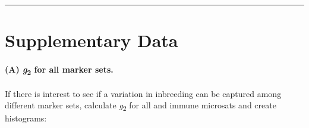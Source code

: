 \documentclass[]{article}
\let\oldparagraph\paragraph
\renewcommand{\paragraph}[1]{\oldparagraph{#1}\mbox{}}
\begin{document}
\begin{center}\rule{0.5\linewidth}{\linethickness}\end{center}

\section{Supplementary Data}\label{supplementary-data}

\paragraph{\texorpdfstring{(A) \emph{g}\textsubscript{2} for all marker
sets.}{(A) g2 for all marker sets.}}\label{a-g2-for-all-marker-sets.}

If there is interest to see if a variation in inbreeding can be captured
among different marker sets, calculate \emph{g}\textsubscript{2} for all
and immune microsats and create histograms:
\end{document}
